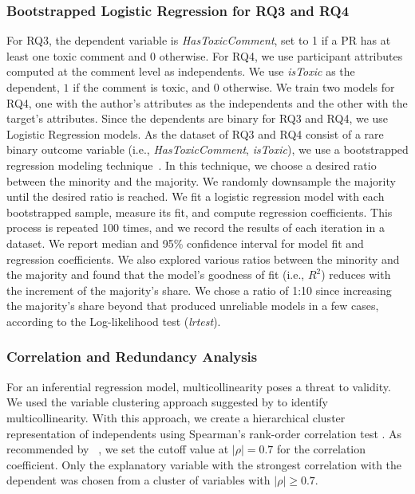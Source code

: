 \subsubsection{Bootstrapped Logistic Regression for RQ3 and RQ4}
For RQ3, the dependent variable is \textit{HasToxicComment}, set to 1 if a PR has at least one toxic comment and 0 otherwise.
For RQ4, we use participant attributes computed at the comment level as independents. We use \textit{isToxic} as the dependent, $1$ if the comment is toxic, and 0 otherwise. 
We train two models for RQ4, one with the author's attributes as the independents and the other with the target's attributes.
Since the dependents are binary for RQ3 and RQ4, we use Logistic Regression models. 
As the dataset of RQ3 and RQ4 consist of a rare binary outcome variable (i.e., \textit{HasToxicComment}, \textit{isToxic}), we use a bootstrapped regression modeling technique~\cite{xu2020applications}. In this technique, we choose a desired ratio between the minority and the majority. We randomly downsample the majority until the desired ratio is reached. We fit a logistic regression model with each bootstrapped sample, measure its fit, and compute regression coefficients. This process is repeated 100 times, and we record the results of each iteration in a dataset. We report median and 95\% confidence interval for model fit and regression coefficients.  We also explored various ratios between the minority and the majority and found that the model's goodness of fit (i.e., $R^2$) reduces with the increment of the majority's share. We chose a ratio of 1:10 since increasing the majority's share beyond that produced unreliable models in a few cases, according to the Log-likelihood test (\textit{lrtest}).



\subsubsection{Correlation and Redundancy Analysis}
For an inferential regression model, multicollinearity poses a threat to validity.  We used the variable clustering approach suggested by \citet{sarle1990sas} to identify multicollinearity. With this approach, we create a hierarchical cluster representation of independents using Spearman's rank-order correlation test \cite{statistics2013spearman}. As recommended by ~\citet{hinkle1998applied}, we set the cutoff value at $|\rho| = 0.7$ for the correlation coefficient. Only the explanatory variable with the strongest correlation with the dependent was chosen from a cluster of variables with $|\rho| \geq 0.7$. 


